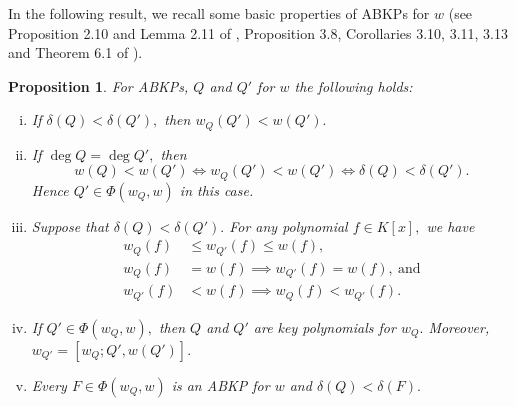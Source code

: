 \documentclass[11pt]{amsart}
\newtheorem{theorem}{Theorem}[section]
\newtheorem{proposition}[theorem]{Proposition}
\theoremstyle{definition}
\theoremstyle{remark}
\numberwithin{equation}{section}
\begin{document}
%	
	

	In the following result, we recall  some basic properties of ABKPs  for  $w$   (see Proposition 2.10 and Lemma 2.11 of  \cite{NS},  Proposition 3.8, Corollaries 3.10, 3.11,  3.13 and Theorem 6.1 of  \cite{JN1}).
	\begin{proposition}\label{abmr}
		For  ABKPs, $Q$ and $Q'$ for $w$ the following holds:
		\begin{enumerate}[(i)]
			\item If  $\delta(Q)<\delta(Q'),$ then $w_Q(Q')<w(Q').$ 
			\item If $\deg Q = \deg Q',$ then $$w(Q)<w(Q')\iff w_Q(Q')<w(Q')\iff \delta(Q)<\delta(Q').$$ Hence $Q'\in\Phi(w_Q,w)$ in this case.
			\item  Suppose that  $\delta(Q)<\delta(Q').$ For any polynomial $f\in K[x],$ we have
			\begin{align*}
				w_Q(f)&\leq w_{Q'}(f)\leq w(f),\\
				w_{Q}(f)&=w(f)\implies w_{Q'}(f)=w(f),~\text{and}\\
				w_{Q'}(f)&<w(f)\implies w_Q(f)<w_{Q'}(f).
			\end{align*}
			\item If $Q'\in \Phi(w_Q,w),$ then $Q$ and $Q'$ are key polynomials for $w_Q.$ Moreover, $w_{Q'}=[w_Q; Q',w(Q')].$
			\item 	 Every $F\in\Phi(w_Q,w)$ is an ABKP for $w$ and $\delta(Q)<\delta(F).$
			
		\end{enumerate}
	\end{proposition}
	
\end{document}
